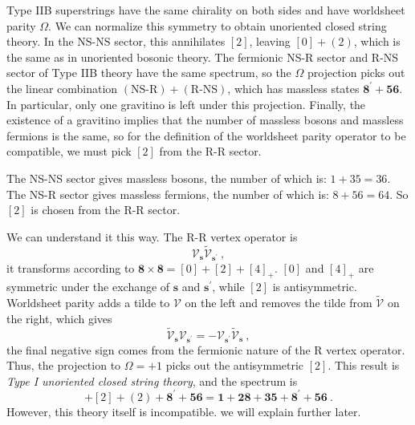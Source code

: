 	Type IIB superstrings have the same chirality on both sides and have worldsheet parity $\Omega$. We can normalize this symmetry to obtain unoriented closed string theory. In the NS-NS sector, this annihilates $[2]$, leaving $[0]+(2)$, which is the same as in unoriented bosonic theory. The fermionic NS-R sector and R-NS sector of Type IIB theory have the same spectrum, so the $\Omega$ projection picks out the linear combination $(\text{NS-R})+(\text{R-NS})$, which has massless states $\mathbf{8}^{\prime}+\mathbf{56}$. In particular, only one gravitino is left under this projection. Finally, the existence of a gravitino implies that the number of massless bosons and massless fermions is the same, so for the definition of the worldsheet parity operator to be compatible, we must pick $[2]$ from the R-R sector. 
	\begin{tcolorbox}[breakable]
		The NS-NS sector gives massless bosons, the number of which is: $1+35=36$. The NS-R sector gives massless fermions, the number of which is: $8+56=64$. So $[2]$ is chosen from the R-R sector.
	\end{tcolorbox}
	\noindent We can understand it this way. The R-R vertex operator is
	\begin{equation}
		\mathscr{V}_{\mathbf{s}}\tilde{\mathscr{V}}_{\mathbf{s}^{\prime}} \:, \label{10.6.16}
	\end{equation}
	it transforms according to $\mathbf{8}\times\mathbf{8}=[0]+[2]+[4]_{+}$. $[0]$ and $[4]_{+}$ are symmetric under the exchange of $\mathbf{s}$ and $\mathbf{s}^{\prime}$, while $[2]$ is antisymmetric. Worldsheet parity adds a tilde to $\mathscr{V}$ on the left and removes the tilde from $\tilde{\mathscr{V}}$ on the right, which gives
	\begin{equation}
		\tilde{\mathscr{V}}_{\mathbf{s}}\mathscr{V}_{\mathbf{s}^{\prime}}
		=-\mathscr{V}_{\mathbf{s}^{\prime}}\tilde{\mathscr{V}}_{\mathbf{s}}\:, \label{10.6.17}
	\end{equation}
	the final negative sign comes from the fermionic nature of the R vertex operator. Thus, the projection to $\Omega=+1$ picks out the antisymmetric $[2]$. This result is \emph{Type I unoriented closed string theory}, and the spectrum is
	\begin{equation}
		[0]+[2]+(2)+\mathbf{8}^{\prime}+\mathbf{56} = \mathbf{1}+\mathbf{28}+\mathbf{35}+\mathbf{8}^{\prime}+\mathbf{56}\:.\label{10.6.18}
	\end{equation}
	However, this theory itself is incompatible. we will explain further later.
	
